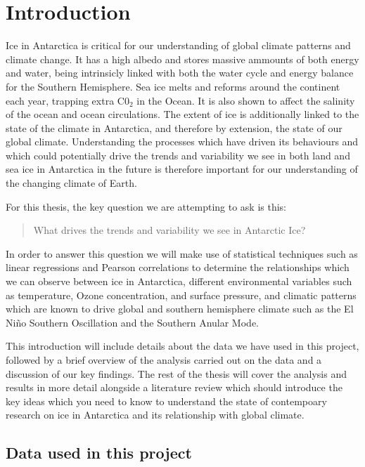 \documentclass[../main.tex]{subfiles}
\begin{document}
\chapter{Introduction}

Ice in Antarctica is critical for our understanding of global climate patterns and climate change. It has a high albedo and stores massive ammounts of both energy and water, being intrinsicly linked with both the water cycle and energy balance for the Southern Hemisphere. Sea ice melts and reforms around the continent each year, trapping extra C0$_2$ in the Ocean. It is also shown to affect the salinity of the ocean and ocean circulations. 
The extent of ice is additionally linked to the state of the climate in Antarctica, and therefore by extension, the state of our global climate. Understanding the processes which have driven its behaviours and which could potentially drive the trends and variability we see in both land and sea ice in Antarctica in the future is therefore important for our understanding of the changing climate of Earth.

For this thesis, the key question we are attempting to ask is this:

\begin{quote}
	What drives the trends and variability we see in Antarctic Ice?
\end{quote}

In order to answer this question we will make use of statistical techniques such as linear regressions and Pearson correlations to determine the relationships which we can observe between ice in Antarctica, different environmental variables such as temperature, Ozone concentration, and surface pressure, and climatic patterns which are known to drive global and southern hemisphere climate such as the El Ni\~no Southern Oscillation and the Southern Anular Mode.

This introduction will include details about the data we have used in this project, followed by a brief overview of the analysis carried out on the data and a discussion of our key findings. The rest of the thesis will cover the analysis and results in more detail alongside a literature review which should introduce the key ideas which you need to know to understand the state of contempoary research on ice in Antarctica and its relationship with global climate.


\pagebreak
\section{Data used in this project}
\end{document}

